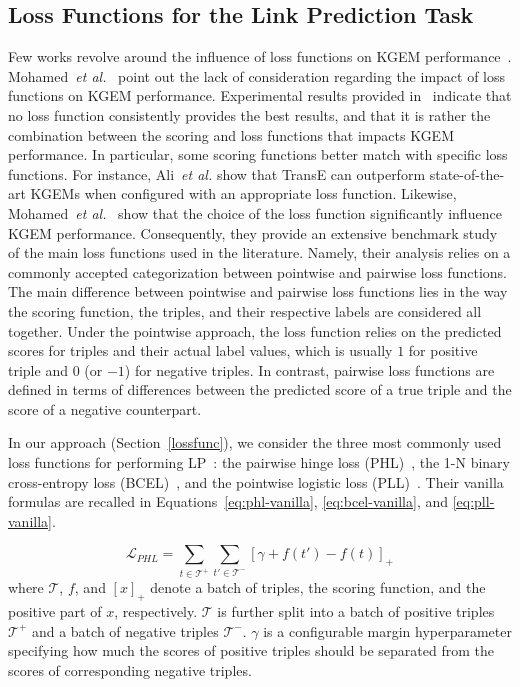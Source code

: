 \documentclass[letterpaper]{article} %
\begin{document}
\subsection{Loss Functions for the Link Prediction Task}\label{related-work:lossfunc}
Few works revolve around the influence of loss functions on KGEM performance~\cite{ali2022,mohamed2019,mohamed2021}. Mohamed~\textit{et al.}~\cite{mohamed2019} point out the lack of consideration regarding the impact of loss functions on KGEM performance.
Experimental results provided in~\cite{ali2022} indicate that no loss function consistently provides the best results, and that it is rather the combination between the scoring and loss functions that impacts KGEM performance. In particular, some scoring functions better match with specific loss functions. For instance, Ali~\textit{et al.} show that TransE can outperform state-of-the-art KGEMs when configured with an appropriate loss function. Likewise, Mohamed~\textit{et al.}~\cite{mohamed2019} show that the choice of the loss function significantly influence KGEM performance. Consequently, they provide an extensive benchmark study of the main loss functions used in the literature. Namely, their analysis relies on a commonly accepted categorization between pointwise and pairwise loss functions. 
The main difference between pointwise and pairwise loss functions lies in the way the scoring function, the triples, and their respective labels are considered all together. Under the pointwise approach, the loss function relies on the predicted scores for triples and their actual label values, which is usually $1$ for positive triple and $0$ (or $-1$) for negative triples. In contrast, pairwise loss functions are defined in terms of differences between the predicted score of a true triple and the score of a negative counterpart. 

In our approach (Section~\ref{lossfunc}), we consider the three most commonly used loss functions for performing LP~\cite{rossi}: the pairwise hinge loss (PHL)~\cite{transe}, the 1-N binary cross-entropy loss (BCEL)~\cite{conve}, and the pointwise logistic loss (PLL)~\cite{complex}. Their vanilla formulas are recalled in Equations~\eqref{eq:phl-vanilla}, \eqref{eq:bcel-vanilla}, and \eqref{eq:pll-vanilla}.

\begin{equation}
\mathcal{L}_{PHL} = \sum_{t\in\mathcal{T^{+}}} \sum_{t'\in\mathcal{T^{-}}}  
\left[ \gamma + f(t') - f(t) \right]_{+}
\label{eq:phl-vanilla}
\end{equation}
where $\mathcal{T}$, $f$, and $[x]_{+}$ denote a batch of triples, the scoring function, and the positive part of $x$, respectively. $\mathcal{T}$ is further split into a batch of positive triples $\mathcal{T^{+}}$ and a batch of negative triples $\mathcal{T^{-}}$. $\gamma$ is a configurable margin hyperparameter specifying how much the scores of positive triples should be separated from the scores of corresponding negative triples.
\end{document}
